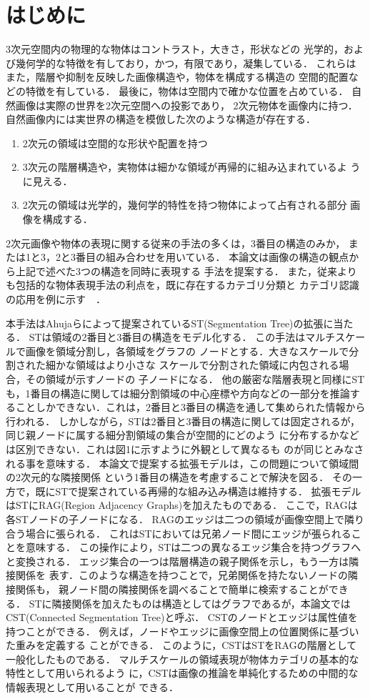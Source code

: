 \section{はじめに}
3次元空間内の物理的な物体はコントラスト，大きさ，形状などの
光学的，および幾何学的な特徴を有しており，かつ，有限であり，凝集している．
これらはまた，階層や抑制を反映した画像構造や，物体を構成する構造の
空間的配置などの特徴を有している．
最後に，物体は空間内で確かな位置を占めている．
自然画像は実際の世界を2次元空間への投影であり，
2次元物体を画像内に持つ．
自然画像内には実世界の構造を模倣した次のような構造が存在する．
\begin{enumerate}
 \item 2次元の領域は空間的な形状や配置を持つ
 \item 3次元の階層構造や，実物体は細かな領域が再帰的に組み込まれているよ
       うに見える．
 \item 2次元の領域は光学的，幾何学的特性を持つ物体によって占有される部分
       画像を構成する．
\end{enumerate}
2次元画像や物体の表現に関する従来の手法の多くは，3番目の構造のみか，
または1と3，2と3番目の組み合わせを用いている．
本論文は画像の構造の観点から上記で述べた3つの構造を同時に表現する
手法を提案する．
また，従来よりも包括的な物体表現手法の利点を，既に存在するカテゴリ分類と
カテゴリ認識の応用を例に示す　．

本手法はAhujaらによって提案されているST(Segmentation
Tree)\cite{Ahuja=2007, Todorovic_2006}の拡張に当たる．
STは領域の2番目と3番目の構造をモデル化する．
この手法はマルチスケールで画像を領域分割し，各領域をグラフの
ノードとする．大きなスケールで分割された細かな領域はより小さな
スケールで分割された領域に内包される場合，その領域が示すノードの
子ノードになる．
他の厳密な階層表現と同様にSTも，1番目の構造に関しては細分割領域の中心座標や方向などの一部分を推論することしかできない．これは，2番目と3番目の構造を通して集められた情報から行われる．
しかしながら，STは2番目と3番目の構造に関しては固定されるが，
同じ親ノードに属する細分割領域の集合が空間的にどのよう
に分布するかなどは区別できない．これは図1に示すように外観として異なるも
のが同じとみなされる事を意味する．
本論文で提案する拡張モデルは，この問題について領域間の2次元的な隣接関係
という1番目の構造を考慮することで解決を図る．
その一方で，既にSTで提案されている再帰的な組み込み構造は維持する．
拡張モデルはSTにRAG(Region Adjacency Graphs)を加えたものである．
ここで，RAGは各STノードの子ノードになる．
RAGのエッジは二つの領域が画像空間上で隣り合う場合に張られる．
これはSTにおいては兄弟ノード間にエッジが張られることを意味する．
この操作により，STは二つの異なるエッジ集合を持つグラフへと変換される．
エッジ集合の一つは階層構造の親子関係を示し，もう一方は隣接関係を
表す．このような構造を持つことで，兄弟関係を持たないノードの隣接関係も，
親ノード間の隣接関係を調べることで簡単に検索することができる．
STに隣接関係を加えたものは構造としてはグラフであるが，本論文では
CST(Connected Segmentation Tree)と呼ぶ．
CSTのノードとエッジは属性値を持つことができる．
例えば，ノードやエッジに画像空間上の位置関係に基づいた重みを定義する
ことができる．
このように，CSTはSTをRAGの階層として一般化したものである．
マルチスケールの領域表現が物体カテゴリの基本的な特性として用いられるよう
に，CSTは画像の推論を単純化するための中間的な情報表現として用いることが
できる．

